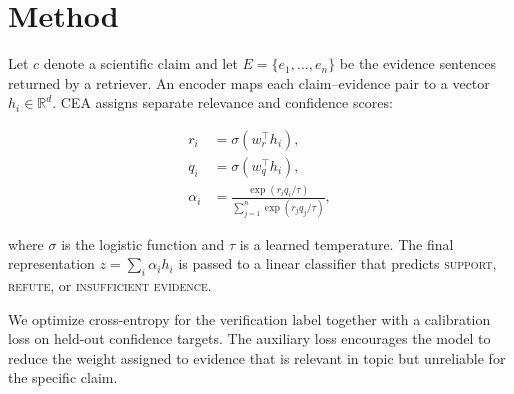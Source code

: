 \section{Method}

Let $c$ denote a scientific claim and let $E = \{e_1, \ldots, e_n\}$ be the evidence
sentences returned by a retriever. An encoder maps each claim--evidence pair to a vector
$h_i \in \mathbb{R}^d$. CEA assigns separate relevance and confidence scores:

\begin{align}
  r_i &= \sigma(w_r^\top h_i), \\
  q_i &= \sigma(w_q^\top h_i), \\
  \alpha_i &= \frac{\exp(r_i q_i / \tau)}
  {\sum_{j=1}^{n} \exp(r_j q_j / \tau)},
\end{align}

where $\sigma$ is the logistic function and $\tau$ is a learned temperature. The final
representation $z = \sum_i \alpha_i h_i$ is passed to a linear classifier that predicts
\textsc{support}, \textsc{refute}, or \textsc{insufficient evidence}.

We optimize cross-entropy for the verification label together with a calibration loss
on held-out confidence targets. The auxiliary loss encourages the model to reduce the
weight assigned to evidence that is relevant in topic but unreliable for the specific
claim.
